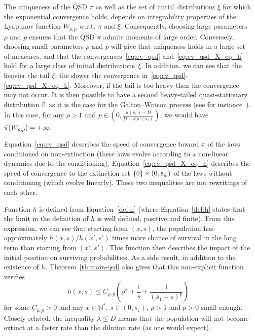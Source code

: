 \documentclass[10pt]{amsart}
\theoremstyle{definition}\newtheorem{defi}[theo]{Definition}\newtheorem{rema}[theo]{Remark}\newtheorem{exam}[theo]{Example}\newtheorem{exem}[theo]{Example}\newtheorem{nota}[theo]{Notation}
\newcommand{\NN}{\mathbb{N}}
\newcommand{\Sin}{{\mathbf s}_{\textrm{\tiny\rm in}}}
\newcommand{\1}{\mathbf{1}}
\let\oldtilde\tilde
\renewcommand*{\tilde}[1]{\mathchoice{\widetilde{#1}}{\widetilde{#1}}{\oldtilde{#1}}{\oldtilde{#1}}}
\begin{document}
The uniqueness of the QSD $\pi$ as well as the set of initial distributions $\xi$ for which the exponential convergence holds, depends on integrability properties of the Lyapunov function $W_{\rho,p}$ w.r.t. $\pi$ and $\xi$. Consequently, choosing large parameters $\rho$ and $p$ ensures that the QSD $\pi$ admits moments of large order. Conversely, choosing small parameters $\rho$ and $p$ will give that uniqueness holds in a large set of measures, and that the convergences~\eqref{eq:cv_qsd} and~\eqref{eq:cv_qsd_X_eq_h} hold for a large class of initial distributions~$\xi$. In addition, we can see that the heavier the tail $\xi$, the slower the convergence in~\eqref{eq:cv_qsd}-\eqref{eq:cv_qsd_X_eq_h}. Moreover, if the tail is too heavy then the convergence may not occur. It is then possible to have a second heavy-tailed quasi-stationary distribution $\tilde \pi$ as it is the case for the Galton--Watson process (see for instance~\cite{MV12}). In this case, for any $\rho>1$ and $p\in(0,\frac{\mu(\bar s_1)-D}{D+k\,\mu'(\bar s_1)})$, we would have $\tilde \pi(W_{\rho,p})=+\infty$.


Equation~\ref{eq:cv_qsd} describes the speed of convergence toward $\pi$ of the laws conditioned on non-extinction (these laws evolve according to a non-linear dynamics due to the conditioning). Equation~\ref{eq:cv_qsd_X_eq_h} describes the speed of convergence to the extinction set $\{0\}\times (0,\Sin)$ of the laws without conditioning (which evolve linearly). These two inequalities are not rewritings of each other.

Function $h$ is defined from Equation~\eqref{def:h} (where Equation~\eqref{def:h} states that the limit in the definition of $h$ is well defined, positive and finite). From this expression, we can see that starting from $(x,s)$, the population has approximately $h(x,s)/h(x',s')$ times more chance of survival in the long term than starting from $(x',s')$. This function then describes the impact of the initial position on surviving probabilities. As a side result, in addition to the existence of $h$, Theorem~\ref{th:main-qsd} also gives that this non-explicit function verifies
\[
h(x,s) \leq C_{\rho,p} \left(\rho^x + \frac{1}{s} + \frac{1}{(\bar{s}_1 -s)^p} \right)
\]
for some $C_{\rho,p}>0$ and any $x \in \NN^*$, $s\in (0,\bar{s}_1)$, $\rho>1$ and $p>0$ small enough. Closely related, the inequality $\lambda \leq D$ means that the population will not become extinct at a faster rate than the dilution rate (as one would expect).
\end{document}
